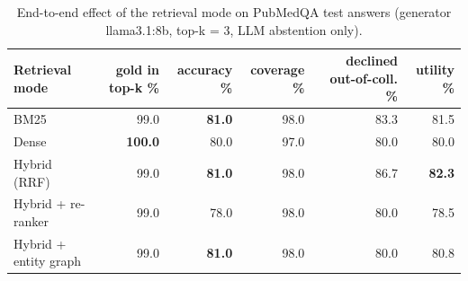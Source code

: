 \begin{table}[t]
\centering\small
\begin{tabular}{lrrrrr}
\toprule
Retrieval mode & gold in top-k \% & accuracy \% & coverage \% & declined out-of-coll. \% & utility \% \\
\midrule
BM25 & 99.0 & \textbf{81.0} & 98.0 & 83.3 & 81.5 \\
Dense & \textbf{100.0} & 80.0 & 97.0 & 80.0 & 80.0 \\
Hybrid (RRF) & 99.0 & \textbf{81.0} & 98.0 & 86.7 & \textbf{82.3} \\
Hybrid + re-ranker & 99.0 & 78.0 & 98.0 & 80.0 & 78.5 \\
Hybrid + entity graph & 99.0 & \textbf{81.0} & 98.0 & 80.0 & 80.8 \\
\bottomrule
\end{tabular}
\caption{End-to-end effect of the retrieval mode on PubMedQA test answers (generator llama3.1:8b, top-k = 3, LLM abstention only).}
\label{tab:ablation_modes}
\end{table}
